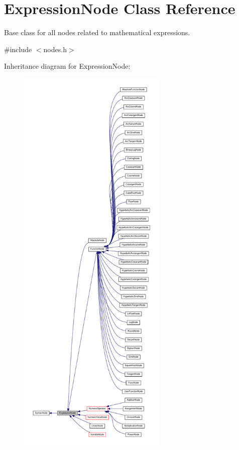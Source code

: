 \hypertarget{classExpressionNode}{}\section{Expression\+Node Class Reference}
\label{classExpressionNode}


Base class for all nodes related to mathematical expressions.  




{\ttfamily \#include $<$nodes.\+h$>$}



Inheritance diagram for Expression\+Node\+:\nopagebreak
\begin{figure}[H]
\begin{center}
\leavevmode
\includegraphics[height=550pt]{classExpressionNode__inherit__graph}
\end{center}
\end{figure}


